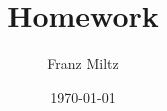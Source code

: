 \documentclass{article}
\begin{document}
\title{Homework}
\author{Franz Miltz}
\date{\today}
\maketitle
\
\end{document}
